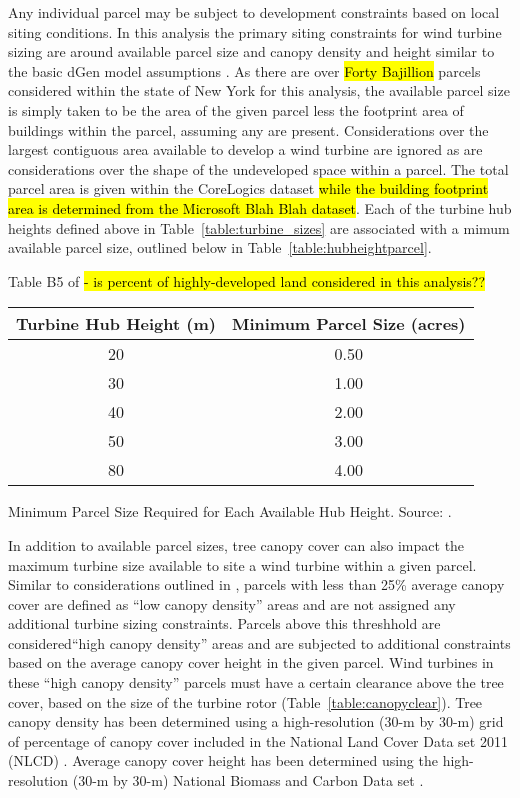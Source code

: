 Any individual parcel may be subject to development constraints based on local siting conditions. In this analysis the primary siting constraints for wind turbine sizing are around available parcel size and canopy density and height similar to the basic dGen model assumptions \cite{sigrin_distributed_2016}. As there are over \hl{Forty Bajillion} parcels considered within the state of New York for this analysis, the available parcel size is simply taken to be the area of the given parcel less the footprint area of buildings within the parcel, assuming any are present. Considerations over the largest contiguous area available to develop a wind turbine are ignored as are considerations over the shape of the undeveloped space within a parcel. The total parcel area is given within the CoreLogics dataset \hl{while the building footprint area is determined from the Microsoft Blah Blah dataset}. Each of the turbine hub heights defined above in Table~\ref{table:turbine_sizes} are associated with a mimum available parcel size, outlined below in Table~\ref{table:hubheightparcel}.

Table B5 of \citet*{sigrin_distributed_2016} \hl{- is percent of highly-developed land considered in this analysis??}

\begin{conditionaltable}[!htb]
\centering
  \begin{tabular}{S|S}
    \toprule
	{Turbine Hub Height (m)} & {Minimum Parcel Size (acres)}\\
      \toprule
		20 	& 0.50 \\
		30 	& 1.00 \\
		40 	& 2.00 \\
		50 	& 3.00 \\
		80 	& 4.00	\\
	\bottomrule
  \end{tabular}
\caption{Minimum Parcel Size Required for Each Available Hub Height. Source: \citet{sigrin_distributed_2016}.}
\label{table:hubheightparcel}
\end{conditionaltable}

In addition to available parcel sizes, tree canopy cover can also impact the maximum turbine size available to site a wind turbine within a given parcel. Similar to considerations outlined in \cite{sigrin_distributed_2016}, parcels with less than 25\% average canopy cover are defined as ``low canopy density'' areas and are not assigned any additional turbine sizing constraints. Parcels above this threshhold are considered``high canopy density'' areas and are subjected to additional constraints based on the average canopy cover height in the given parcel. Wind turbines in these ``high canopy density'' parcels must have a certain clearance above the tree cover, based on the size of the turbine rotor (Table~\ref{table:canopyclear}). Tree canopy density has been determined using a high-resolution (30-m by 30-m) grid of percentage of canopy cover included in the National Land Cover Data set 2011 (NLCD) \cite{jin_comprehensive_2013}. Average canopy cover height has been determined using the high-resolution (30-m by 30-m) National Biomass and Carbon Data set \cite{kellndorfer_nacp_2013}.

